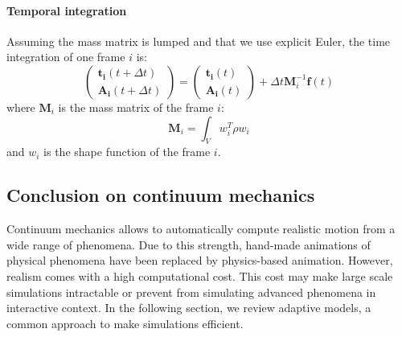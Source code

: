 \paragraph{Temporal integration}

Assuming the mass matrix is lumped and that we use explicit Euler, the time integration of one frame $i$ is:
\begin{equation}
\displaystyle
\begin{pmatrix}
\mathbf{t_{i}}(t+\Delta t) \\
\mathbf{A_{i}}(t+\Delta t)
\end{pmatrix} 
=
\begin{pmatrix}
\mathbf{t_{i}}(t) \\
\mathbf{A_{i}}(t)
\end{pmatrix} 
+
\Delta t
\mathbf{M}_{i}^{-1}
\mathbf{f}(t)
\end{equation}
where $\mathbf{M}_{i}$ is the mass matrix of the frame $i$:
\begin{equation}
\label{eq:massMatrix}
\mathbf{M}_{i} = \int_{V} w_{i}^{T} \rho w_{i}
\end{equation}
and $w_{i}$ is the shape function of the frame $i$.

\subsection{Conclusion on continuum mechanics}

Continuum mechanics allows to automatically compute realistic motion from a wide range of phenomena.
Due to this strength, hand-made animations of physical phenomena have been replaced by physics-based animation.
However, realism comes with a high computational cost.
This cost may make large scale simulations intractable or prevent from simulating advanced phenomena in interactive context.
In the following section, we review adaptive models, a common approach to make simulations efficient.
